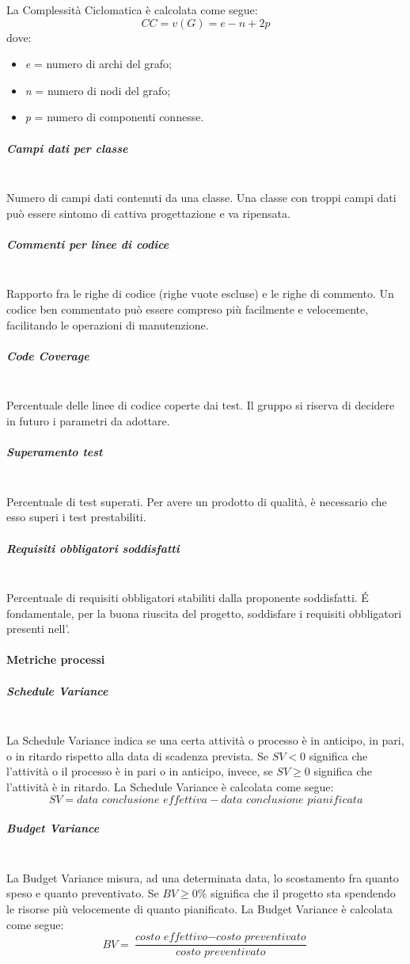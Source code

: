 La Complessità Ciclomatica è calcolata come segue:
\[
CC = v(G) = e - n + 2p
\]
dove:
\begin{itemize}
	\item \emph{e} = numero di archi del grafo;
	\item \emph{n} = numero di nodi del grafo;
	\item \emph{p} = numero di componenti connesse.
\end{itemize}
\subparagraph{Campi dati per classe}\mbox{}\\
Numero di campi dati contenuti da una classe. Una classe con troppi campi dati può essere sintomo di cattiva progettazione e va ripensata.
\subparagraph{Commenti per linee di codice}\mbox{}\\
Rapporto fra le righe di codice (righe vuote escluse) e le righe di commento. Un codice ben commentato può essere compreso più facilmente e velocemente, facilitando le operazioni di manutenzione.
\subparagraph{Code Coverage}\mbox{}\\
Percentuale delle linee di codice coperte dai test.
Il gruppo \gruppo \space si riserva di decidere in futuro i parametri da adottare.
\subparagraph{Superamento test}\mbox{}\\
Percentuale di test superati. Per avere un prodotto di qualità, è necessario che esso superi i test prestabiliti.
\subparagraph{Requisiti obbligatori soddisfatti}\mbox{}\\
Percentuale di requisiti obbligatori stabiliti dalla proponente soddisfatti. \'E fondamentale, per la buona riuscita del progetto, soddisfare i requisiti obbligatori presenti nell'\AdR .
	
\paragraph{Metriche processi}\mbox{}
\subparagraph{Schedule Variance}\mbox{}\\
La Schedule Variance indica se una certa attività o processo è in anticipo, in pari, o in ritardo rispetto alla data di scadenza prevista.
Se $SV < 0$ significa che l'attività o il processo è in pari o in anticipo, invece, se $SV \geq 0$ significa che l'attività è in ritardo.
La Schedule Variance è calcolata come segue:
\[
SV = \textit{data conclusione effettiva} - \textit{data conclusione pianificata}
\]
\subparagraph{Budget Variance}\mbox{}\\
La Budget Variance misura, ad una determinata data, lo scostamento fra quanto speso e quanto preventivato. Se $BV \geq 0\%$ significa che il progetto sta spendendo le risorse più velocemente di quanto pianificato.
La Budget Variance è calcolata come segue:
\[
BV = \frac{\textit{costo effettivo} - \textit{costo preventivato}}{\textit{costo preventivato}}
\]


